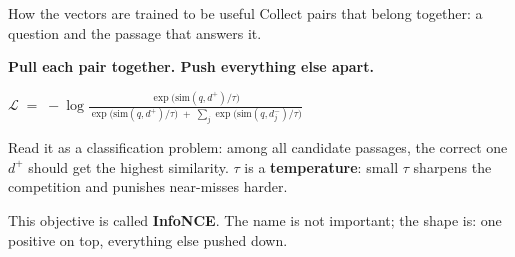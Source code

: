 \documentclass[aspectratio=169]{beamer}
\newcommand{\watchbox}[1]{%
  \begin{tcolorbox}[colback=armorange!12, colframe=armorange, boxrule=0.6pt, arc=2pt]
  #1
  \end{tcolorbox}}
\begin{document}
\begin{frame}{How the vectors are trained to be useful}
  \vspace{0.6em}
  Collect pairs that belong together: a question and the passage that answers it.

  \vspace{0.6em}
  \begin{center}
    \textbf{Pull each pair together. Push everything else apart.}
  \end{center}

  \vspace{0.6em}
  \begin{center}
    $\displaystyle
      \mathcal{L} \;=\; -\log
      \frac{\exp\!\big(\text{sim}(q, d^{+})/\tau\big)}
           {\exp\!\big(\text{sim}(q, d^{+})/\tau\big) \;+\; \sum_{j}\exp\!\big(\text{sim}(q, d_j^{-})/\tau\big)}
    $
  \end{center}

  \vspace{0.9em}
  {\small Read it as a classification problem: among all candidate passages, the correct
  one $d^{+}$ should get the highest similarity. $\tau$ is a \textbf{temperature}: small
  $\tau$ sharpens the competition and punishes near-misses harder.}

  \vspace{0.6em}
  \watchbox{This objective is called \textbf{InfoNCE}. The name is not important; the shape
  is: one positive on top, everything else pushed down.}
\end{frame}
\end{document}
